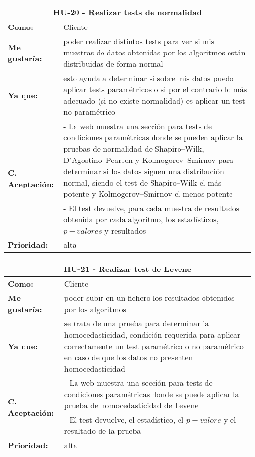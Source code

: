 \begin{table}[H]
	\begin{tabular}{| p{3cm}| p{12cm} |}
		\hline
		\multicolumn{2}{|c|}{\textbf{HU-20} - Realizar tests de normalidad} \\ \hline
		\textbf{Como:} & Cliente \\ \hline
		\textbf{Me gustaría:} & poder realizar distintos tests para ver si mis muestras de datos obtenidas por los algoritmos están distribuidas de forma normal \\ \hline
		\textbf{Ya que:} & esto ayuda a determinar si sobre mis datos puedo aplicar tests paramétricos o si por el contrario lo más adecuado (si no existe normalidad) es aplicar un test no paramétrico \\ \hline
		\multirow{2}{12cm}{\textbf{C. Aceptación:}} & - La web muestra una sección para tests de condiciones paramétricas donde se pueden aplicar la pruebas de normalidad de Shapiro–Wilk, D’Agostino–Pearson y Kolmogorov–Smirnov para determinar si los datos siguen una distribución normal, siendo el test de Shapiro–Wilk el más potente y Kolmogorov–Smirnov el menos potente \\
		& - El test devuelve, para cada muestra de resultados obtenida por cada algoritmo, los estadísticos, $p-valores$ y resultados \\ \hline
		\textbf{\textbf{Prioridad:}} & alta \\ \hline
	\end{tabular}
\end{table}


\begin{table}[H]
	\begin{tabular}{| p{3cm}| p{12cm} |}
		\hline
		\multicolumn{2}{|c|}{\textbf{HU-21} - Realizar test de Levene} \\ \hline
		\textbf{Como:} & Cliente \\ \hline
		\textbf{Me gustaría:} & poder subir en un fichero los resultados obtenidos por los algoritmos \\ \hline
		\textbf{Ya que:} & se trata de una prueba para determinar la homocedasticidad, condición requerida para aplicar correctamente un test paramétrico o no paramétrico en caso de que los datos no presenten homocedasticidad \\ \hline
		\multirow{2}{12cm}{\textbf{C. Aceptación:}} & - La web muestra una sección para tests de condiciones paramétricas donde se puede aplicar la prueba de homocedasticidad de Levene \\
		& - El test devuelve, el estadístico, el $p-valore$ y el resultado de la prueba \\ \hline
		\textbf{\textbf{Prioridad:}} & alta \\ \hline
	\end{tabular}
\end{table}

